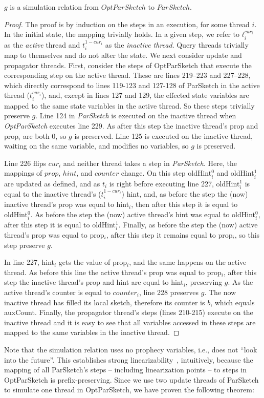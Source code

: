 \begin{lemma}
    $g$ is a simulation relation from $OptParSketch$ to $ParSketch$.
\end{lemma}
\begin{proof}
The proof is by induction on the steps in an execution, for some thread $i$. In the initial state, the mapping trivially holds.
In a given step, we refer to $t_i^{cur_i}$ as the \emph{active} thread and $t_i^{1-cur_i}$ as the \emph{inactive thread}. 
Query threads trivially map to themselves and do not alter the state. We next consider update and propagator threads. 
First, consider the steps of OptParSketch that execute the corresponding step on the active thread.
These are lines 219--223 and 227--228, which directly correspond to lines 119-123 and 127-128 of ParSketch in the
active thread ($t_i^{cur_i}$), and, except in lines 127 and 129, the effected state variables are mapped to the
same state variables in the active thread. So these steps trivially preserve $g$.
Line 124 in \emph{ParSketch} is executed on the inactive thread when \emph{OptParSketch} executes line 229. As after
this step the inactive thread's prop and prop$_i$ are both $0$, so $g$ is preserved. 
Line 125 is executed on the inactive thread, waiting on the same variable, and modifies no variables, so $g$ is preserved.

Line 226 flips $cur_i$ and neither thread takes a step in \emph{ParSketch}. Here, the mappings of $prop$, $hint$, and $counter$ change. 
On this step oldHint$_i^0$ and oldHint$_i^1$ are updated as defined, and as $t_i$ is right before
executing line 227, oldHint$_i^1$ is equal to the inactive thread's ($t_i^{1-cur_i}$) hint, and, as before the step the (now)
inactive thread's prop was equal to hint$_i$, then after this step it is equal to oldHint$_i^0$.
As before the step the (now) active thread's hint was equal to oldHint$_i^0$, after this step it is equal to oldHint$_i^1$. Finally,
as before the step the (now) active thread's prop was equal to prop$_i$, after this step it remains equal to prop$_i$, so this
step preserve $g$.

In line 227, hint$_i$ gets the value of prop$_i$, and the same happens on the active thread. As before this line the
active thread's prop was equal to prop$_i$, after this step the inactive thread's prop and hint are equal to hint$_i$,
preserving $g$.
As the active thread's counter is equal to $counter_i$, line 228 preserves $g$.
The now inactive thread has filled its local sketch, therefore its counter is $b$, which equals
auxCount.  
Finally, the propagator thread’s steps (lines 210-215) execute on the inactive
thread and it is easy to see that all variables accessed in these steps are mapped to the same variables in the inactive thread. 
\end{proof}

Note that the simulation relation uses no prophecy variables, i.e., does not ``look into the future''.
This establishes strong linearizability~\cite{attiya2019putting}, intuitively, because 
the mapping of all ParSketch’s steps -- including linearization points --  to steps in OptParSketch is prefix-preserving.
Since we use two update threads of ParSketch to simulate one thread in OptParSketch, we have proven the following theorem:

\optgenereicstrong*